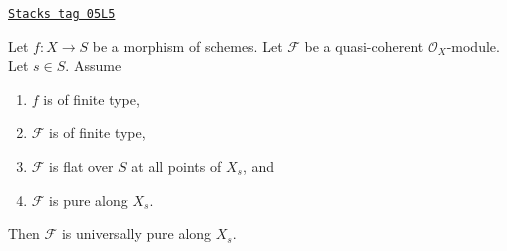 \begin{lemma}
\label{flat-lemma-finite-type-flat-pure-along-fibre-is-universal}
\href{https://stacks.math.columbia.edu/tag/05L5}{\texttt{Stacks tag 05L5}}

Let $f : X \to S$ be a morphism of schemes.
Let $\mathcal{F}$ be a quasi-coherent $\mathcal{O}_X$-module.
Let $s \in S$.
Assume
\begin{enumerate}
\item $f$ is of finite type,
\item $\mathcal{F}$ is of finite type,
\item $\mathcal{F}$ is flat over $S$ at all points of $X_s$, and
\item $\mathcal{F}$ is pure along $X_s$.
\end{enumerate}
Then $\mathcal{F}$ is universally pure along $X_s$.
\end{lemma}

